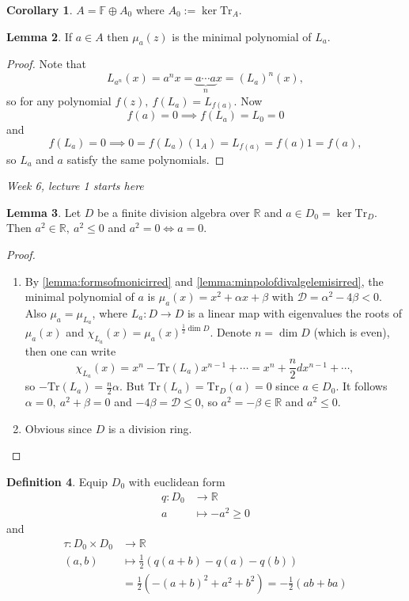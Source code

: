 \documentclass[a4paper]{article}
\newcommand{\Tr}{\text{Tr}}
\newcommand{\F}{\mathbb{F}}
\newcommand{\R}{\mathbb{R}}
\theoremstyle{definition}
\newtheorem{defn}{Definition}[subsection]
\newtheorem{lemma}[defn]{Lemma}
\newtheorem{coro}[defn]{Corollary}
\begin{document}
\begin{coro}
$A=\F\oplus A_0$ where $A_0:=\ker\Tr_A$.
\end{coro}

\begin{lemma}
If $a\in A$ then $\mu_a(z)$ is the minimal polynomial of $L_a$.
\end{lemma}
\begin{proof}
Note that
\[
L_{a^n}(x)=a^nx=\underbrace{a\cdots a}_n x=(L_a)^n(x),
\]
so for any polynomial $f(z),\ f(L_a)=L_{f(a)}$. Now
\[
f(a)=0\implies f(L_a)=L_0=0
\]
and
\[
f(L_a)=0\implies 0=f(L_a)(1_A)=L_{f(a)}=f(a)1=f(a),
\]
so $L_a$ and $a$ satisfy the same polynomials.
\end{proof}

\begin{flushright}
\textit{Week 6, lecture 1 starts here}
\end{flushright}

\begin{lemma}
Let $D$ be a finite division algebra over $\R$ and $a\in D_0=\ker\Tr_D$. Then $a^2\in\R,\ a^2\leq 0$ and $a^2=0\iff a=0$.
\end{lemma}
\begin{proof}
\begin{enumerate}
\item By \ref{lemma:formsofmonicirred} and \ref{lemma:minpolofdivalgelemisirred}, the minimal polynomial of $a$ is $\mu_a(x)=x^2+\alpha x+\beta$ with $\mathcal D=\alpha^2-4\beta <0$. Also $\mu_a=\mu_{L_a}$, where $L_a:D\rightarrow D$ is a linear map with eigenvalues the roots of $\mu_a(x)$ and $\chi_{L_a}(x)=\mu_a(x)^{\frac12\dim D}$. Denote $n=\dim D$ (which is even), then one can write
\[
\chi_{L_a}(x)=x^n-\Tr(L_a)x^{n-1}+\cdots=x^n+\frac{n}{2}dx^{n-1}+\cdots,
\]
so $-\Tr(L_a)=\frac{n}{2}\alpha$. But $\Tr(L_a)=\Tr_D(a)=0$ since $a\in D_0$. It follows $\alpha=0,\ a^2+\beta=0$ and $-4\beta=\mathcal D\leq 0$, so $a^2=-\beta\in\R$ and $a^2\leq 0$.
\item Obvious since $D$ is a division ring.
\end{enumerate}
\end{proof}

\begin{defn}
Equip $D_0$ with euclidean form
\[
\begin{aligned}
q:D_0&\rightarrow\R\\
a&\mapsto -a^2\geq 0
\end{aligned}
\]
and
\[
\begin{aligned}
\tau:D_0\times D_0&\rightarrow\R\\
(a,b)&\mapsto \frac12 \left(q(a+b)-q(a)-q(b)\right)\\
&=\frac12\left(-(a+b)^2+a^2+b^2\right)=-\frac12(ab+ba)
\end{aligned}
\]
\end{defn}
\end{document}
